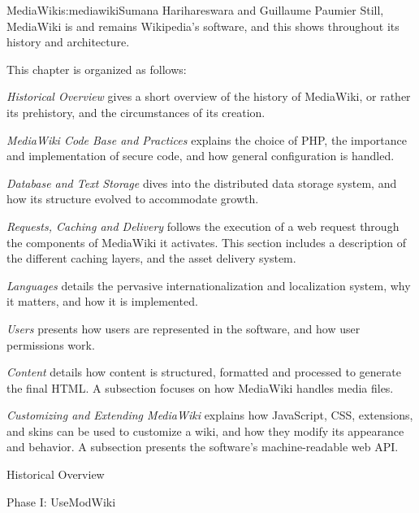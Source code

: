 \begin{aosachapter}{MediaWiki}{s:mediawiki}{Sumana Harihareswara and Guillaume Paumier}
Still, MediaWiki is and remains Wikipedia's software, and this shows
throughout its history and architecture.

This chapter is organized as follows:

\begin{aosaitemize}

\item \emph{Historical Overview} gives a short overview of the history
  of MediaWiki, or rather its prehistory, and the circumstances of its
  creation.

\item \emph{MediaWiki Code Base and Practices} explains the choice of
  PHP, the importance and implementation of secure code, and how
  general configuration is handled.

\item \emph{Database and Text Storage} dives into the distributed data
  storage system, and how its structure evolved to accommodate growth.

\item \emph{Requests, Caching and Delivery} follows the execution of a
  web request through the components of MediaWiki it activates. This
  section includes a description of the different caching layers, and
  the asset delivery system.

\item \emph{Languages} details the pervasive internationalization and
  localization system, why it matters, and how it is implemented.

\item \emph{Users} presents how users are represented in the software,
  and how user permissions work.

\item \emph{Content} details how content is structured, formatted and
  processed to generate the final HTML. A subsection focuses on how
  MediaWiki handles media files.

\item \emph{Customizing and Extending MediaWiki} explains how
  JavaScript, CSS, extensions, and skins can be used to customize a
  wiki, and how they modify its appearance and behavior. A subsection
  presents the software's machine-readable web API.

\end{aosaitemize}

\begin{aosasect1}{Historical Overview}

\begin{aosasect2}{Phase I: UseModWiki}


\end{aosasect2}
\end{aosasect1}
\end{aosachapter}
